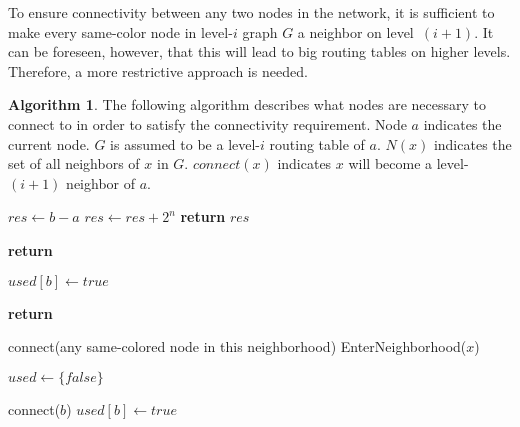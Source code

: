 \documentclass[14pt]{extarticle}
\theoremstyle{definition}
\newtheorem{algo}{Algorithm}
\begin{document}
To ensure connectivity between any two nodes in the network, it is sufficient to make every same-color node in level-$i$ graph $G$ a neighbor on level~$(i+1)$. It can be foreseen, however, that this will lead to big routing tables on higher levels. Therefore, a more restrictive approach is needed.

\begin{algo}
    The following algorithm describes what nodes are necessary to connect to in order to satisfy the connectivity requirement. Node $a$ indicates the current node. $G$ is assumed to be a level-$i$ routing table of $a$. $N(x)$ indicates the set of all neighbors of $x$ in $G$. $connect(x)$ indicates $x$ will become a level-$(i+1)$ neighbor of $a$.

    \begin{samepage}
    \begin{algorithmic}[1]
                          
            \State $res \gets b-a$
                \State $res \gets res + 2^n$       
            \EndIf
            \State \textbf{return} $res$
        \EndFunction
        
        \State

                \State \textbf{return}      
            \EndIf
                
            \State $used[b] \gets true$

                \State \textbf{return}      
            \EndIf

                \State connect(any same-colored node in this neighborhood)
            \Else
                    \State EnterNeighborhood($x$)
                \EndFor
            \EndIf
        \EndFunction

        \State

            \State $used \gets \{false\}$

                    \State connect($b$)      
                \Else
                    \State $used[b] \gets true$


\end{algorithmic}
\end{samepage}
\end{algo}
\end{document}
